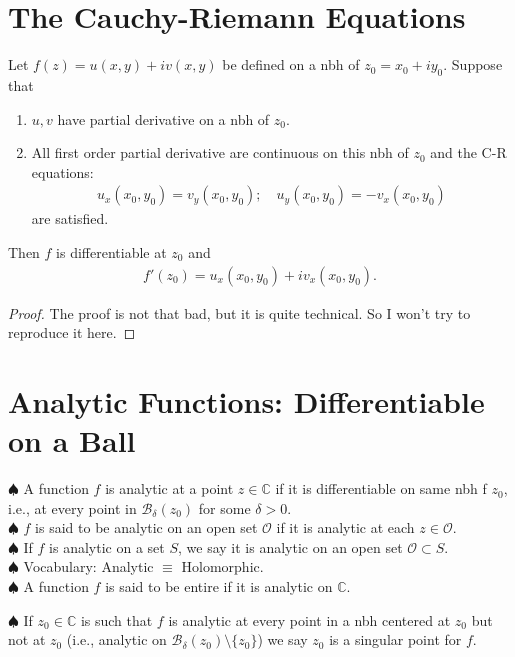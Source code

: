 \documentclass{article}
\theoremstyle{definition}
\newcommand{\C}{\mathbb{C}}
\newcommand{\B}{\mathcal{B}}
\begin{document}
\section{The Cauchy-Riemann Equations}

Let $f(z) = u(x,y) + iv(x,y)$ be defined on a nbh of $z_0 = x_0 + iy_0$. Suppose that 
\begin{enumerate}
	\item $u,v$ have partial derivative on a nbh of $z_0$.
	\item All first order partial derivative are continuous on this nbh of $z_0$ and the C-R equations:
	\begin{align}
	u_x(x_0,y_0) = v_y(x_0,y_0);\quad u_y(x_0,y_0) = -v_x(x_0,y_0)
	\end{align}
	are satisfied.
\end{enumerate}
Then $f$ is differentiable at $z_0$ and
\begin{align}
f'(z_0) = u_x(x_0,y_0) + iv_x(x_0,y_0).
\end{align}


\begin{proof}
	The proof is not that bad, but it is quite technical. So I won't try to reproduce it here.
\end{proof}


\section{Analytic Functions: Differentiable on a Ball}

\noindent $\spadesuit$ A function $f$ is analytic at a point $z \in \C$ if it is differentiable on same nbh f $z_0$, i.e., at every point in $\B_\delta(z_0)$ for some $\delta > 0$.\\

\noindent $\spadesuit$ $f$ is said to be analytic on an open set $\mathcal{O}$ if it is analytic at each $z\in \mathcal{O}$.\\

\noindent $\spadesuit$ If $f$ is analytic on a set $S$, we say it is analytic on an open set $\mathcal{O} \subset S$. \\

\noindent $\spadesuit$ Vocabulary: Analytic $\equiv$ Holomorphic.\\

\noindent $\spadesuit$ A function $f$ is said to be entire if it is analytic on $\C$.

\noindent $\spadesuit$ If $z_0 \in \C$ is such that $f$ is analytic at every point in a nbh centered at $z_0$ but not at $z_0$ (i.e., analytic on $\B_\delta(z_0)\setminus \{z_0\}$) we say $z_0$ is a singular point for $f$. \\
\end{document}
